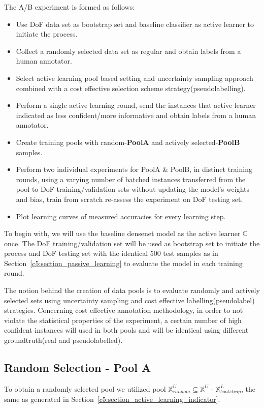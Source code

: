 The A/B experiment is formed as follows:
\begin{itemize}
 \item Use DoF data set as bootstrap set and baseline classifier as active learner to initiate the process.
 \item Collect a randomly selected data set as regular and obtain labels from a human annotator.
 \item Select active learning pool based setting and uncertainty sampling approach combined with a cost effective selection scheme strategy(pseudolabelling).
 \item Perform a single active learning round, send the instances that active learner indicated as less confident/more informative and obtain labels from a human annotator.
 \item Create training pools with random-\textbf{PoolA} and actively selected-\textbf{PoolB} samples.
 \item Perform two individual experiments for PoolA \& PoolB, in distinct training rounds, using a varying number of batched instances transferred from the pool to DoF training/validation sets without updating the model's weights and bias, train from scratch re-assess the experiment on DoF testing set.
 \item Plot learning curves of measured accuracies for every learning step.
\end{itemize}

To begin with, we will use the baseline densenet model as the active learner $\mathbb{C}$ once. The DoF training/validation set will be used as bootstrap set to initiate the process and DoF testing set with the identical 500 test samples as in Section~\ref{c5:section_passive_learning} to evaluate the model in each training round.

The notion behind the creation of data pools is to evaluate randomly and actively selected sets using uncertainty sampling and cost effective labelling(pseudolabel) strategies. 
Concerning cost effective annotation methodology, in order to not violate the statistical properties of the experiment, a certain number of high confident instances will used in both pools and will be identical using different groundtruth(real and pseudolabelled).

\subsection{Random Selection - Pool A}

To obtain a randomly selected pool we utilized pool $\mathbb{X}^U_{random} \subseteq  \mathbb{X}^U$ - $\mathbb{X}^L_{bootstrap}$, the same as generated in Section~\ref{c5:section_active_learning_indicator}.

